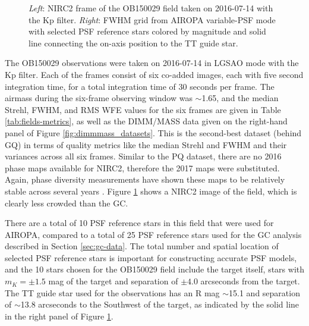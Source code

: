 \documentclass[]{spie}  %
\begin{document}
\begin{figure}[!h]
 \caption{\footnotesize \textit{Left}: NIRC2 frame of the OB150029 field taken on 2016-07-14 with the Kp filter. \textit{Right}: FWHM grid from AIROPA variable-PSF mode with selected PSF reference stars colored by magnitude and solid line connecting the on-axis position to the TT guide star.} \label{fig:ob150029}
\end{figure}

The OB150029 observations were taken on 2016-07-14 in LGSAO mode with the Kp filter. Each of the frames consist of six co-added images, each with five second integration time, for a total integration time of 30 seconds per frame. The airmass during the six-frame observing window was $\sim$1.65, and the median Strehl, FWHM, and RMS WFE values for the six frames are given in Table \ref{tab:fields-metrics}, as well as the DIMM/MASS data given on the right-hand panel of Figure \ref{fig:dimmmass_datasets}. This is the second-best dataset (behind GQ) in terms of quality metrics like the median Strehl and FWHM and their variances across all six frames. Similar to the PQ dataset, there are no 2016 phase maps available for NIRC2, therefore the 2017 maps were substituted. Again, phase diversity measurements have shown these maps to be relatively stable across several years \citep{Ciurlo:inprep}. Figure \ref{fig:ob150029} shows a NIRC2 image of the field, which is clearly less crowded than the GC. 

\indent There are a total of 10 PSF reference stars in this field that were used for AIROPA, compared to a total of 25 PSF reference stars used for the GC analysis described in Section \ref{sec:gc-data}. The total number and spatial location of selected PSF reference stars is important for constructing accurate PSF models, and the 10 stars chosen for the OB150029 field include the target itself, stars with $m_K = \pm 1.5$ mag of the target and separation of $\pm4.0$ arcseconds from the target. The TT guide star used for the observations has an R mag ${\sim}$15.1 and separation of ${\sim}$13.8 arcseconds to the Southwest of the target, as indicated by the solid line in the right panel of Figure \ref{fig:ob150029}.
\end{document}
